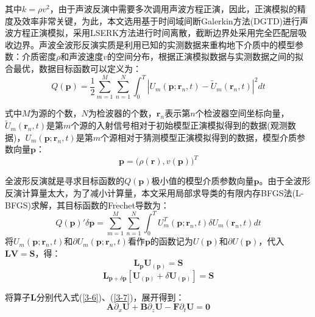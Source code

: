 \documentclass[12pt]{article}
\begin{document}
\par
其中$k=\rho v^2$，由于声波反演中需要多次调用声波方程正演，因此，正演模拟的精度及效率非常关键，为此，本文选用基于时间域间断Galerkin方法(DGTD)进行声波方程正演模拟，采用LSERK方法进行时间离散，截断边界处采用完全匹配层吸收边界。声波全波形反演实质是利用已知的实测数据来重构地下介质中的模型参数：介质密度$\rho$和声波速度$v$的空间分布，根据正演模拟数据与实测数据之间的拟合最优，数据目标函数可以定义为：
\begin{equation}\label{3-3}
Q(\boldsymbol{p})=\frac{1}{2}\sum_{m=1}^{M}\sum_{n=1}^{N}\int_{0}^{T} |U_m(\boldsymbol{p};\boldsymbol{r}_n,t)-\tilde{U}_m(\boldsymbol{r}_n,t)|^2dt
\end{equation}
\par
式中$M$为源的个数，$N$为检波器的个数，$\boldsymbol{r}_n$表示第$n$个检波器空间坐标向量，$\tilde{U}_m(\boldsymbol{r}_n,t)$是第$m$个源的入射信号相对于初始模型正演模拟得到的数据(观测数据)，$U_m(\boldsymbol{p};\boldsymbol{r}_n,t)$是第$m$个源相对于猜测模型正演模拟得到的数据，模型介质参数向量$\boldsymbol{p}$：
\begin{equation}\label{3-4}
\boldsymbol{p}=\big(\rho(\boldsymbol{r}),v(\boldsymbol{p})\big)^T
\end{equation}
\par
全波形反演就是寻求目标函数的$Q(\boldsymbol{p})$极小值的模型介质参数向量$\boldsymbol{p}$。由于全波形反演计算量太大，为了减小计算量，本文采用局部求导类的有限内存BFGS法(L-BFGS)求解，其目标函数的Fr$\acute{\mathrm{e}}$chet导数为：
\begin{equation}\label{3-5}
Q(\boldsymbol{p})' \delta\boldsymbol{p}=\sum_{m=1}^{M}\sum_{n=1}^{N} \int_{0}^{T} U^T_m(\boldsymbol{p};\boldsymbol{r}_n,t)\delta U_m(\boldsymbol{r}_n,t)dt
\end{equation}
将$U_m(\boldsymbol{p};\boldsymbol{r}_n,t)$和$\partial U_m(\boldsymbol{p};\boldsymbol{r}_n,t)$看作$\boldsymbol{p}$的函数记为$U(\boldsymbol{p})$和$\partial U(\boldsymbol{p})$，代入$\boldsymbol{LV=S}$，得：
\begin{equation}\label{3-6}
\boldsymbol{L_p}\boldsymbol{U}_{(\boldsymbol{p})}=\boldsymbol{S}
\end{equation}
\begin{equation}\label{3-7}
\boldsymbol{L}_{\boldsymbol{p}+\delta \boldsymbol{p}}[\boldsymbol{U}_{(\boldsymbol{p})}+\delta\boldsymbol{U}_{(\boldsymbol{p})}]=\boldsymbol{S}
\end{equation}
\par
将算子$\boldsymbol{L}$分别代入式(\ref{3-6})、(\ref{3-7})，展开得到：
\begin{equation}\label{3-8}
\boldsymbol{A}\partial_x \boldsymbol{U}+\boldsymbol{B}\partial_z \boldsymbol{U}-\boldsymbol{F}\partial_t \boldsymbol{U}=\boldsymbol{0}
\end{equation}
\end{document}
